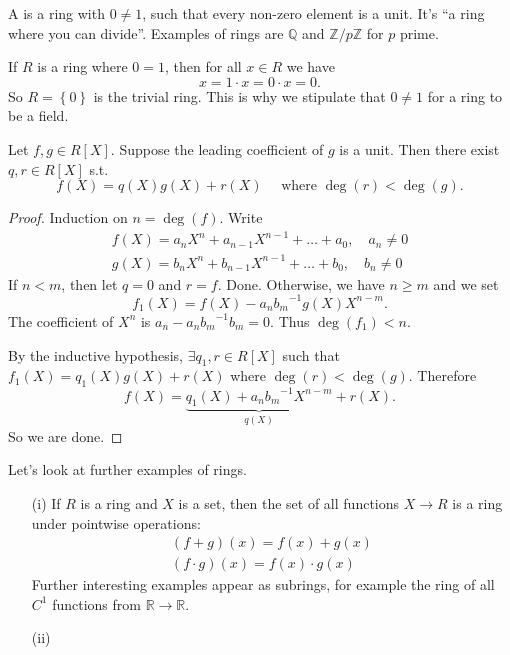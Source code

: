 \documentclass[a4paper]{scrartcl}
\begin{document}
\begin{definition*}[Field]
       A  is a ring with $0 \neq 1$, such that every non-zero element is a unit. It's ``a ring where you can divide''. Examples of rings are $\mathbb{Q} $ and $\mathbb{Z}/p\mathbb{Z}$ for $p$ prime.
\end{definition*}
\begin{remark}
       If $R$ is a ring where $0=1$, then for all $x \in R$ we have \[
       x=1 \cdot x =0 \cdot x=0
       .\] So $R=\left\{0\right\}$ is the trivial ring. This is why we stipulate that $0 \neq 1$ for a ring to be a field.
\end{remark}
\begin{proposition}
       Let $f,g \in R[X]$. Suppose the leading coefficient of $g$ is a unit. Then there exist $q, r \in R[X]$ s.t. \[
       f (X)=q (X)g (X)+r (X) \quad \text{ where } \operatorname{deg}(r) < \operatorname{deg}(g)
       .\] 
\end{proposition}
\begin{proof}
       Induction on $n=\operatorname{deg}(f)$. Write \begin{align*}
             f (X)= a_{n}X^{n}+a_{n-1}X^{n-1}+ \ldots +a_0 , \quad a_{n}\neq 0\\
             g (X)= b_{n}X^{n}+b_{n-1}X^{n-1}+ \ldots +b_0 , \quad b_{n}\neq 0
       \end{align*}
       If $n<m$, then let $q=0$ and $r=f$. Done. Otherwise, we have $n \geq m$ and we set \[
       f_1 (X)= f (X)-a_{n} {b_{m}}^{-1} g (X) X ^{n-m}
       .\] The coefficient of $X^{n}$ is $a_{n}-a_{n}{b_{m}}^{-1}b_{m}=0$. Thus  $\operatorname{deg}(f_{1})<n$. 
       
       By the inductive hypothesis, $\exists q_1 ,r \in R[X]$ such that $f_1 (X)=q_1 (X)g (X)+r (X)$ where $\operatorname{deg}(r) < \operatorname{deg}(g)$. Therefore \[
       f (X)=\underbrace{q_1 (X)+a_n {b_{m}}^{-1} X ^{n-m}}_{q (X)}+r (X) 
       .\] So we are done. 
\end{proof}
\begin{example*}
       Let's look at further examples of rings.
       \begin{itemize}
             \item[(i)] If $R$ is a ring and $X$ is a set, then the set of all functions $X \rightarrow R$ is a ring under pointwise operations: \begin{align*}
                   (f+g)(x)= f (x)+g (x)\\
                   (f \cdot  g)(x)=f (x) \cdot  g (x)
             \end{align*} Further interesting examples appear as subrings, for example the ring of all $C^{1}$ functions from $\mathbb{R} \rightarrow \mathbb{R}$.
             \item[(ii)] 
       \end{itemize}
\end{example*}
\end{document}
